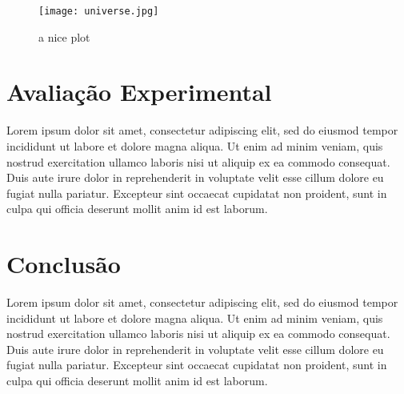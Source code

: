 \documentclass[12pt, a4paper,twocolumn]{article}
\begin{document}
\begin{figure}[h]
    \centering
    \texttt{[image: universe.jpg]}
    \caption{a nice plot}
    \label{fig:mesh1}
\end{figure}

\section{Avaliação Experimental}
Lorem ipsum dolor sit amet, consectetur adipiscing elit, sed do eiusmod tempor incididunt ut labore et dolore magna aliqua. Ut enim ad minim veniam, quis nostrud exercitation ullamco laboris nisi ut aliquip ex ea commodo consequat. Duis aute irure dolor in reprehenderit in voluptate velit esse cillum dolore eu fugiat nulla pariatur. Excepteur sint occaecat cupidatat non proident, sunt in culpa qui officia deserunt mollit anim id est laborum.

\section{Conclusão}
Lorem ipsum dolor sit amet, consectetur adipiscing elit, sed do eiusmod tempor incididunt ut labore et dolore magna aliqua. Ut enim ad minim veniam, quis nostrud exercitation ullamco laboris nisi ut aliquip ex ea commodo consequat. Duis aute irure dolor in reprehenderit in voluptate velit esse cillum dolore eu fugiat nulla pariatur. Excepteur sint occaecat cupidatat non proident, sunt in culpa qui officia deserunt mollit anim id est laborum.

\printbibliography
\end{document}
